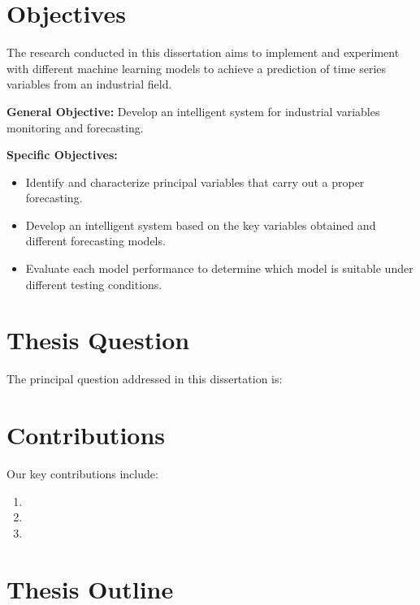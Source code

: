 \section{Objectives}
\label{s:Objectives}
The research conducted in this dissertation aims to implement and experiment with different machine learning models to achieve a prediction of time series variables from an industrial field.


\textbf{General Objective:} Develop an intelligent system for industrial variables monitoring and forecasting.

\textbf{Specific Objectives:}

\begin{itemize}
\item Identify and characterize principal variables that carry out a proper forecasting.
\item Develop an intelligent system based on the key variables obtained and different forecasting models.
\item Evaluate each model performance to determine which model is suitable under different testing conditions.
\end{itemize}

\section{Thesis Question}
\label{s:Question}
The principal question addressed in this dissertation is:


\section{Contributions}
\label{s:Contributions}

Our key contributions include:

\begin{enumerate}

  \item {}
  
  \item {}
  
  \item {}

\end{enumerate}

\section{Thesis Outline}
\label{s:Outline}

